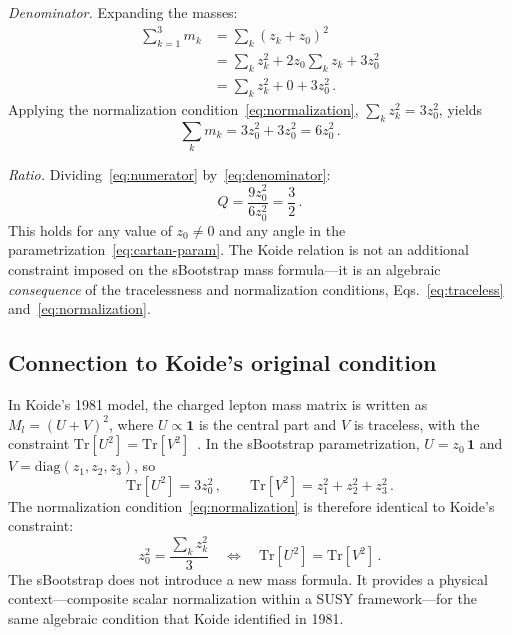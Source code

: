 \documentclass[prd,twocolumn,superscriptaddress,nofootinbib]{revtex4-2}
\newcommand{\Tr}{\mathrm{Tr}}
\begin{document}
\medskip\noindent\textit{Denominator.}\quad
Expanding the masses:
\begin{align}
  \sum_{k=1}^3 m_k
  &= \sum_k(z_k+z_0)^2\nonumber\\
  &= \sum_k z_k^2 + 2z_0\sum_k z_k + 3z_0^2\nonumber\\
  &= \sum_k z_k^2 + 0 + 3z_0^2\,.
  \label{eq:denom-step1}
\end{align}
Applying the normalization condition~\eqref{eq:normalization},
$\sum_k z_k^2 = 3z_0^2$, yields
\begin{equation}
  \sum_k m_k = 3z_0^2 + 3z_0^2 = 6z_0^2\,.
  \label{eq:denominator}
\end{equation}

\medskip\noindent\textit{Ratio.}\quad
Dividing~\eqref{eq:numerator} by~\eqref{eq:denominator}:
\begin{equation}
  \boxed{Q = \frac{9z_0^2}{6z_0^2} = \frac{3}{2}\,.}
  \label{eq:Q-proof}
\end{equation}
This holds for any value of $z_0\neq 0$ and any angle in
the parametrization~\eqref{eq:cartan-param}.  The Koide relation is
not an additional constraint imposed on the sBootstrap mass
formula---it is an algebraic \emph{consequence} of the tracelessness
and normalization conditions, Eqs.~\eqref{eq:traceless}
and~\eqref{eq:normalization}.

\subsection{Connection to Koide's original condition}
\label{sec:koide-condition}

In Koide's 1981 model, the charged lepton mass matrix is written as
$M_l=(U+V)^2$, where $U\propto\mathbf{1}$ is the central part and $V$
is traceless, with the constraint $\Tr[U^2]=\Tr[V^2]$~\cite{Koide1983prd}.
In the sBootstrap parametrization, $U=z_0\,\mathbf{1}$ and
$V=\text{diag}(z_1,z_2,z_3)$, so
\begin{equation}
  \Tr[U^2] = 3z_0^2\,,\qquad
  \Tr[V^2] = z_1^2+z_2^2+z_3^2\,.
  \label{eq:traces}
\end{equation}
The normalization condition~\eqref{eq:normalization} is therefore
identical to Koide's constraint:
\begin{equation}
  z_0^2 = \frac{\sum_k z_k^2}{3}
  \quad\Longleftrightarrow\quad
  \Tr[U^2] = \Tr[V^2]\,.
  \label{eq:koide-sboot-equiv}
\end{equation}
The sBootstrap does not introduce a new mass formula.  It provides a
physical context---composite scalar normalization within a SUSY
framework---for the same algebraic condition that Koide identified in
1981.
\end{document}
